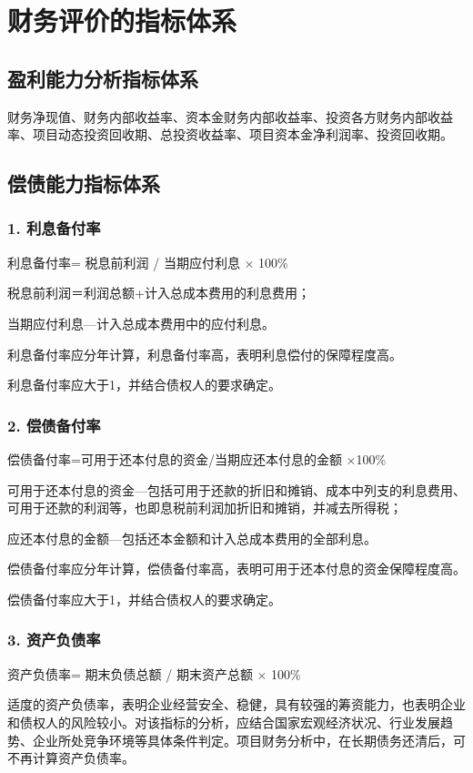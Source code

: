 \section{财务评价的指标体系}
\subsection{盈利能力分析指标体系}
财务净现值、财务内部收益率、资本金财务内部收益率、投资各方财务内部收益率、项目动态投资回收期、总投资收益率、项目资本金净利润率、投资回收期。

\subsection{偿债能力指标体系}
\subsubsection{1. 利息备付率}
利息备付率= 税息前利润 / 当期应付利息 $\times$ 100\%

税息前利润＝利润总额+计入总成本费用的利息费用；

当期应付利息—计入总成本费用中的应付利息。

利息备付率应分年计算，利息备付率高，表明利息偿付的保障程度高。

利息备付率应大于1，并结合债权人的要求确定。

\subsubsection{2. 偿债备付率}
偿债备付率=可用于还本付息的资金/当期应还本付息的金额 $\times $100\%

可用于还本付息的资金—包括可用于还款的折旧和摊销、成本中列支的利息费用、可用于还款的利润等，也即息税前利润加折旧和摊销，并减去所得税；

应还本付息的金额—包括还本金额和计入总成本费用的全部利息。

偿债备付率应分年计算，偿债备付率高，表明可用于还本付息的资金保障程度高。

偿债备付率应大于1，并结合债权人的要求确定。

\subsubsection{3. 资产负债率}
资产负债率= 期末负债总额 / 期末资产总额 $\times $ 100\%

适度的资产负债率，表明企业经营安全、稳健，具有较强的筹资能力，也表明企业和债权人的风险较小。对该指标的分析，应结合国家宏观经济状况、行业发展趋势、企业所处竞争环境等具体条件判定。项目财务分析中，在长期债务还清后，可不再计算资产负债率。


